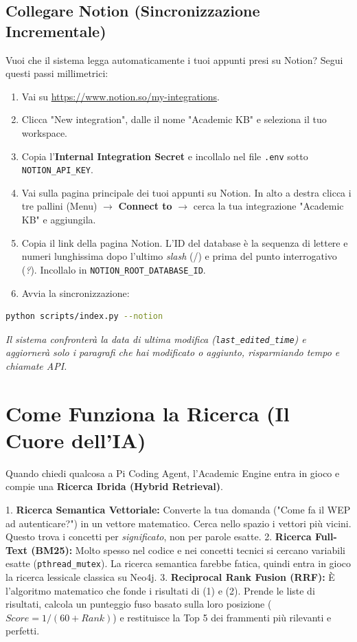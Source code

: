 \documentclass[12pt,a4paper]{article}
\begin{document}
\subsection{Collegare Notion (Sincronizzazione Incrementale)}
Vuoi che il sistema legga automaticamente i tuoi appunti presi su Notion? Segui questi passi millimetrici:
\begin{enumerate}
    \item Vai su \url{https://www.notion.so/my-integrations}.
    \item Clicca "New integration", dalle il nome "Academic KB" e seleziona il tuo workspace.
    \item Copia l'\textbf{Internal Integration Secret} e incollalo nel file \texttt{.env} sotto \texttt{NOTION\_API\_KEY}.
    \item Vai sulla pagina principale dei tuoi appunti su Notion. In alto a destra clicca i tre pallini (Menu) $\rightarrow$ \textbf{Connect to} $\rightarrow$ cerca la tua integrazione "Academic KB" e aggiungila.
    \item Copia il link della pagina Notion. L'ID del database è la sequenza di lettere e numeri lunghissima dopo l'ultimo \textit{slash} (/) e prima del punto interrogativo (\textit{?}). Incollalo in \texttt{NOTION\_ROOT\_DATABASE\_ID}.
    \item Avvia la sincronizzazione:
\end{enumerate}
\begin{lstlisting}[language=bash]
python scripts/index.py --notion
\end{lstlisting}
\textit{Il sistema confronterà la data di ultima modifica (\texttt{last\_edited\_time}) e aggiornerà solo i paragrafi che hai modificato o aggiunto, risparmiando tempo e chiamate API.}

\section{Come Funziona la Ricerca (Il Cuore dell'IA)}
Quando chiedi qualcosa a Pi Coding Agent, l'Academic Engine entra in gioco e compie una \textbf{Ricerca Ibrida (Hybrid Retrieval)}.

1. \textbf{Ricerca Semantica Vettoriale:} Converte la tua domanda ("Come fa il WEP ad autenticare?") in un vettore matematico. Cerca nello spazio i vettori più vicini. Questo trova i concetti per \textit{significato}, non per parole esatte.
2. \textbf{Ricerca Full-Text (BM25):} Molto spesso nel codice e nei concetti tecnici si cercano variabili esatte (\texttt{pthread\_mutex}). La ricerca semantica farebbe fatica, quindi entra in gioco la ricerca lessicale classica su Neo4j.
3. \textbf{Reciprocal Rank Fusion (RRF):} È l'algoritmo matematico che fonde i risultati di (1) e (2). Prende le liste di risultati, calcola un punteggio fuso basato sulla loro posizione ($Score = 1 / (60 + Rank)$) e restituisce la Top 5 dei frammenti più rilevanti e perfetti.
\end{document}
